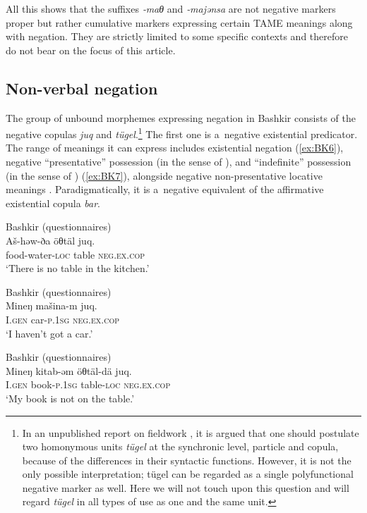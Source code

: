 \documentclass[output=paper]{langsci/langscibook}
\begin{document}
All this shows that the suffixes \textit{‑maθ} and \textit{‑majənsa} are not negative markers proper but rather cumulative markers expressing certain TAME meanings along with negation. They are strictly limited to some specific contexts and therefore do not bear on the focus of this article.

\subsection{Non-verbal negation}\label{sec:BK2.2}

The group of unbound morphemes expressing negation in Bashkir consists of the negative copulas \textit{juq} and \textit{tügel}.\footnote{In an unpublished report on fieldwork \citep{mishchenko2011a}, it is argued that one should postulate two homonymous units \textit{tügel} at the synchronic level, particle and copula, because of the differences in their syntactic functions. However, it is not the only possible interpretation; tügel can be regarded as a single polyfunctional negative marker as well. Here we will not touch upon this question and will regard \textit{tügel} in all types of use as one and the same unit.} The first one is a negative existential predicator. The range of meanings it can express includes existential negation (\ref{ex:BK6}), negative “presentative” possession (in the sense of \citealp{hengeveld1992a}), and “indefinite” possession (in the sense of \citealp{stassen2009a}) (\ref{ex:BK7}), alongside negative non-presentative locative meanings . Paradigmatically, it is a negative equivalent of the affirmative existential copula \textit{bar}.

\ea Bashkir (questionnaires) \label{ex:BK6}\\
	\gll Aš-həw-ða			öθtäl		juq.\\
	food-water-\textsc{loc}	table		\textsc{neg.ex.cop}\\
	\glt `There is no table in the kitchen.'
\z

\ea Bashkir (questionnaires) \label{ex:BK7}\\
	\gll Mineŋ		mašina-m	juq.\\
	I.\textsc{gen}		car-\textsc{p.1sg}	\textsc{neg.ex.cop}\\
	\glt `I haven’t got a car.'
\z

\ea Bashkir (questionnaires) \label{ex:BK8}\\
	\gll Mineŋ		kitab-əm		öθtäl-dä		juq.\\
	I.\textsc{gen}		book-\textsc{p.1sg}	table-\textsc{loc}	\textsc{neg.ex.cop}\\
	\glt `My book is not on the table.'
\z
\end{document}
